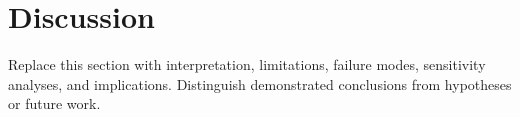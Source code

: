 \section{Discussion}
\label{sec:discussion}

Replace this section with interpretation, limitations, failure modes, sensitivity analyses, and implications. Distinguish demonstrated conclusions from hypotheses or future work.
